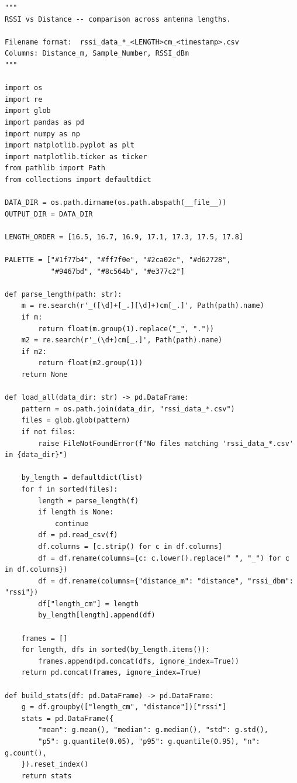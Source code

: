 \begin{lstlisting}[style=appendix-py, caption={Multi-file RSSI plotting (antenna comparison)}, label={lst:rssi-plot}]
"""
RSSI vs Distance -- comparison across antenna lengths.

Filename format:  rssi_data_*_<LENGTH>cm_<timestamp>.csv
Columns: Distance_m, Sample_Number, RSSI_dBm
"""

import os
import re
import glob
import pandas as pd
import numpy as np
import matplotlib.pyplot as plt
import matplotlib.ticker as ticker
from pathlib import Path
from collections import defaultdict

DATA_DIR = os.path.dirname(os.path.abspath(__file__))
OUTPUT_DIR = DATA_DIR

LENGTH_ORDER = [16.5, 16.7, 16.9, 17.1, 17.3, 17.5, 17.8]

PALETTE = ["#1f77b4", "#ff7f0e", "#2ca02c", "#d62728",
           "#9467bd", "#8c564b", "#e377c2"]

def parse_length(path: str):
    m = re.search(r'_([\d]+[_.][\d]+)cm[_.]', Path(path).name)
    if m:
        return float(m.group(1).replace("_", "."))
    m2 = re.search(r'_(\d+)cm[_.]', Path(path).name)
    if m2:
        return float(m2.group(1))
    return None

def load_all(data_dir: str) -> pd.DataFrame:
    pattern = os.path.join(data_dir, "rssi_data_*.csv")
    files = glob.glob(pattern)
    if not files:
        raise FileNotFoundError(f"No files matching 'rssi_data_*.csv' in {data_dir}")

    by_length = defaultdict(list)
    for f in sorted(files):
        length = parse_length(f)
        if length is None:
            continue
        df = pd.read_csv(f)
        df.columns = [c.strip() for c in df.columns]
        df = df.rename(columns={c: c.lower().replace(" ", "_") for c in df.columns})
        df = df.rename(columns={"distance_m": "distance", "rssi_dbm": "rssi"})
        df["length_cm"] = length
        by_length[length].append(df)

    frames = []
    for length, dfs in sorted(by_length.items()):
        frames.append(pd.concat(dfs, ignore_index=True))
    return pd.concat(frames, ignore_index=True)

def build_stats(df: pd.DataFrame) -> pd.DataFrame:
    g = df.groupby(["length_cm", "distance"])["rssi"]
    stats = pd.DataFrame({
        "mean": g.mean(), "median": g.median(), "std": g.std(),
        "p5": g.quantile(0.05), "p95": g.quantile(0.95), "n": g.count(),
    }).reset_index()
    return stats


\end{lstlisting}
